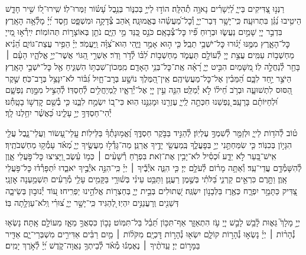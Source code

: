 \documentclass[twoside, openany, parskip=half, 11pt]{book}
\begin{document}
\begin{narrow}
רַנְּנ֣וּ צַ֭דִּיקִים בַּייָ֑
לַ֝יְשָׁרִ֗ים נָאוָ֥ה תְ֯הִלָּֽה׃
הוֹד֣וּ לַייָ֣ בְּכִנּ֑וֹר בְּנֵ֥בֶל עָ֝שׂ֗וֹר זַמְּרוּ־לֽוֹ׃
שִֽׁירוּ־ל֭וֹ שִׁ֣יר חָדָ֑שׁ הֵיטִ֥יבוּ נַ֝גֵּ֗ן בִּתְרוּעָֽה׃
כִּֽי־יָשָׁ֥ר דְּבַר־יְיָ֑ וְ֯כׇל־מַ֝עֲשֵׂ֗הוּ בֶּאֱמוּנָֽה׃
אֹ֭הֵב צְ֯דָקָ֣ה וּמִשְׁפָּ֑ט חֶ֥סֶד יְ֝יָ֗ מָלְ֯אָ֥ה הָאָֽרֶץ׃
בִּדְבַ֣ר יְיָ֭ שָׁמַ֣יִם נַעֲשׂ֑וּ וּבְר֥וּחַ פִּ֗֝יו כׇּל־צְ֯בָאָֽם׃
כֹּנֵ֣ס כַּ֭נֵּד מֵ֣י הַיָּ֑ם נֹתֵ֖ן בְּאוֹצָר֣וֹת תְּהוֹמֽוֹת׃
יִֽירְ֯א֣וּ מֵ֭ייָ כׇּל־הָאָ֑רֶץ מִמֶּ֥נּוּ יָ֝ג֗וּרוּ כׇּל־יֹשְׁבֵ֥י תֵבֵֽל׃
כִּ֤י ה֣וּא אָמַ֣ר וַיֶּ֑הִי הֽוּא־צִ֝וָּ֗ה וַֽיַּעֲמֹֽד׃
יְיָ֗ הֵפִ֥יר עֲצַת־גּוֹיִ֑ם הֵ֝נִ֗יא מַחְשְׁב֥וֹת עַמִּֽים׃
עֲצַ֣ת יְיָ֭ לְ֯עוֹלָ֣ם תַּעֲמֹ֑ד מַחְשְׁב֥וֹת לִ֝בּ֗וֹ לְ֯דֹ֣ר וָדֹֽר׃
אַשְׁרֵ֣י הַ֭גּוֹי אֲשֶׁר־יְיָ֣ אֱלֹהָ֑יו הָעָ֓ם ׀ בָּחַ֖ר לְ֯נַחֲלָ֣ה לֽוֹ׃
מִ֭שָּׁמַיִם הִבִּ֣יט יְיָ֑ רָ֝אָ֗ה אֶֽת־כׇּל־בְּנֵ֥י הָאָדָֽם׃
מִֽמְּכוֹן־שִׁבְתּ֥וֹ הִשְׁגִּ֑יחַ אֶ֖ל כׇּל־יֹשְׁבֵ֣י הָאָֽרֶץ׃
הַיֹּצֵ֣ר יַ֣חַד לִבָּ֑ם הַ֝מֵּבִ֗ין אֶל־כׇּל־מַעֲשֵׂיהֶֽם׃
אֵֽין־הַ֭מֶּלֶךְ נוֹשָׁ֣ע בְּרׇב־חָ֑יִל גִּ֝בּ֗וֹר לֹא־יִנָּצֵ֥ל בְּרׇב־כֹּֽחַ׃
שֶׁ֣קֶר הַ֭סּוּס לִתְשׁוּעָ֑ה וּבְרֹ֥ב חֵ֝יל֗וֹ לֹ֣א יְ֯מַלֵּֽט׃
הִנֵּ֤ה עֵ֣ין יְיָ֭ אֶל־יְ֯רֵאָ֑יו לַֽמְיַחֲלִ֥ים לְ֯חַסְדּֽוֹ׃
לְ֯הַצִּ֣יל מִמָּ֣וֶת נַפְשָׁ֑ם וּ֝לְחַיּוֹתָ֗ם בָּרָעָֽב׃
נַ֭פְשֵׁנוּ חִכְּתָ֣ה לַֽייָ֑ עֶזְרֵ֖נוּ וּמָגִנֵּ֣נוּ הֽוּא׃
כִּי־ב֭וֹ יִשְׂמַ֣ח לִבֵּ֑נוּ כִּ֤י בְ֯שֵׁ֖ם קׇדְשׁ֣וֹ בָטָֽחְ֯נוּ׃
יְ֯הִי־חַסְדְּךָ֣ יְיָ֣ עָלֵ֑ינוּ כַּ֝אֲשֶׁ֗ר יִחַ֥לְנוּ לָֽךְ׃
\end{narrow}
\newcommand{\mizmorshabbat}{
\firstword{מִזְמ֥וֹר שִׁ֗יר לְ֯י֣וֹם הַשַּׁבָּֽת׃}\source{תהלים צב}
ט֗וֹב לְ֯הֹד֥וֹת לַייָ֑ וּלְזַמֵּ֖ר לְ֯שִׁמְךָ֣ עֶלְיֽוֹן׃
לְ֯הַגִּ֣יד בַּבֹּ֣קֶר חַסְדֶּ֑ךָ וֶ֝אֱמ֥וּנָתְ֯ךָ֗ בַּלֵּילֽוֹת׃
עֲֽלֵי־עָ֭שׂוֹר וַעֲלֵי־נָ֑בֶל עֲלֵ֖י הִגָּי֣וֹן בְּכִנּֽוֹר׃
כִּ֤י שִׂמַּחְתַּ֣נִי יְיָ֣ בְּפׇעֳלֶ֑ךָ בְּֽמַעֲשֵׂ֖י יָדֶ֣יךָ אֲרַנֵּֽן׃
מַה־גָּדְ֯ל֣וּ מַעֲשֶׂ֣יךָ יְיָ֑ מְ֝אֹ֗ד עָמְ֯ק֥וּ מַחְשְׁבֹתֶֽיךָ׃
אִֽישׁ־בַּ֭עַר לֹ֣א יֵדָ֑ע וּ֝כְסִ֗יל לֹא־יָבִ֥ין אֶת־זֹֽאת׃
בִּפְרֹ֤חַ רְ֯שָׁעִ֨ים ׀ כְּמ֥וֹ עֵ֗שֶׂב וַ֭יָּצִיצוּ כׇּל־פֹּ֣עֲלֵי אָ֑וֶן לְ֯הִשָּׁמְ֯דָ֥ם עֲדֵי־עַֽד׃
וְ֯אַתָּ֥ה מָר֗וֹם לְ֯עֹלָ֥ם יְיָ׃
כִּ֤י הִנֵּ֪ה אֹיְ֯בֶ֡יךָ ׀ יְיָ֗ כִּֽי־הִנֵּ֣ה אֹיְ֯בֶ֣יךָ יֹאבֵ֑דוּ יִ֝תְפָּרְ֯ד֗וּ כׇּל־פֹּ֥עֲלֵי אָֽוֶן׃
וַתָּ֣רֶם כִּרְאֵ֣ים קַרְנִ֑י בַּ֝לֹּתִ֗י בְּשֶׁ֣מֶן רַעֲנָֽן׃
וַתַּבֵּ֥ט עֵינִ֗י בְּשׁ֫וּרָ֥י בַּקָּמִ֖ים עָלַ֥י מְ֯רֵעִ֗ים תִּשְׁמַ֥עְנָה אׇזְנָֽי׃
צַ֭דִּיק כַּתָּמָ֣ר יִפְרָ֑ח כְּאֶ֖רֶז בַּלְּבָנ֣וֹן יִשְׂגֶּֽה׃
שְׁ֭תוּלִים בְּבֵ֣ית יְיָ֑ בְּחַצְר֖וֹת אֱלֹהֵ֣ינוּ יַפְרִֽיחוּ׃
ע֭וֹד יְ֯נוּב֣וּן בְּשֵׂיבָ֑ה דְּשֵׁנִ֖ים וְֽרַעֲנַנִּ֣ים יִהְיֽוּ׃
לְ֭הַגִּיד כִּֽי־יָשָׁ֣ר יְיָ֑ צ֝וּרִ֗י וְֽלֹא־עַוְלָ֥תָה בּֽוֹ׃
}
\begin{narrow}
\mizmorshabbat

יְיָ֣ מָלָךְ֮ גֵּא֢וּת לָ֫בֵ֥שׁ
לָבֵ֣שׁ יְיָ֭ עֹ֣ז הִתְאַזָּ֑ר אַף־תִּכּ֥וֹן תֵּ֝בֵ֗ל בַּל־תִּמּֽוֹט׃
נָכ֣וֹן כִּסְאֲךָ֣ מֵאָ֑ז מֵעוֹלָ֣ם אָֽתָּה׃
נָשְׂא֤וּ נְ֯הָר֨וֹת ׀ יְיָ֗ נָשְׂא֣וּ נְ֯הָר֣וֹת קוֹלָ֑ם יִשְׂא֖וּ נְ֯הָר֣וֹת דׇּכְיָֽם׃
מִקֹּל֨וֹת ׀ מַ֤יִם רַבִּ֗ים אַדִּירִ֣ים מִשְׁבְּרֵי־יָ֑ם אַדִּ֖יר בַּמָּר֣וֹם יְיָ׃
עֵֽדֹתֶ֨יךָ ׀ נֶאֶמְנ֬וּ מְ֯אֹ֗ד לְ֯בֵיתְךָ֥ נַאֲוָה־קֹ֑דֶשׁ יְ֝יָ֗ לְ֯אֹ֣רֶךְ יָמִֽים׃

\end{narrow}
\end{document}
